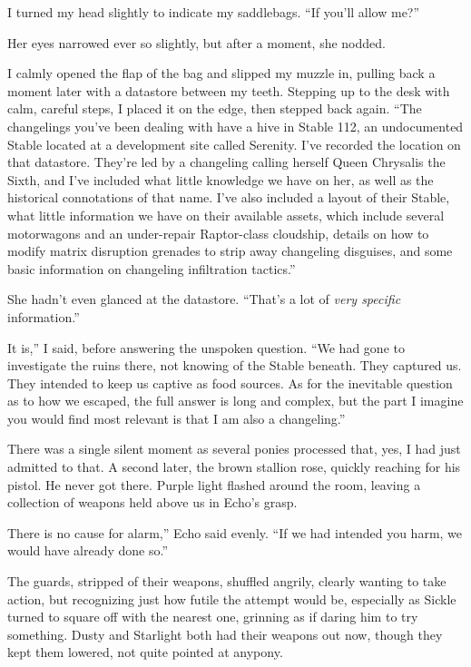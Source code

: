 I turned my head slightly to indicate my saddlebags. “If you’ll allow me?”

Her eyes narrowed ever so slightly, but after a moment, she nodded.

I calmly opened the flap of the bag and slipped my muzzle in, pulling back a moment later with a datastore between my teeth. Stepping up to the desk with calm, careful steps, I placed it on the edge, then stepped back again. “The changelings you’ve been dealing with have a hive in Stable 112, an undocumented Stable located at a development site called Serenity. I’ve recorded the location on that datastore. They’re led by a changeling calling herself Queen Chrysalis the Sixth, and I’ve included what little knowledge we have on her, as well as the historical connotations of that name. I’ve also included a layout of their Stable, what little information we have on their available assets, which include several motorwagons and an under-repair Raptor-class cloudship, details on how to modify matrix disruption grenades to strip away changeling disguises, and some basic information on changeling infiltration tactics.”

She hadn’t even glanced at the datastore. “That’s a lot of \textit{very specific} information.”

\leavevmode{}It is,” I said, before answering the unspoken question. “We had gone to investigate the ruins there, not knowing of the Stable beneath. They captured us. They intended to keep us captive as food sources. As for the inevitable question as to how we escaped, the full answer is long and complex, but the part I imagine you would find most relevant is that I am also a changeling.”

There was a single silent moment as several ponies processed that, yes, I had just admitted to that. A second later, the brown stallion rose, quickly reaching for his pistol. He never got there. Purple light flashed around the room, leaving a collection of weapons held above us in Echo’s grasp.

\leavevmode{}There is no cause for alarm,” Echo said evenly. “If we had intended you harm, we would have already done so.”

The guards, stripped of their weapons, shuffled angrily, clearly wanting to take action, but recognizing just how futile the attempt would be, especially as Sickle turned to square off with the nearest one, grinning as if daring him to try something. Dusty and Starlight both had their weapons out now, though they kept them lowered, not quite pointed at anypony.

